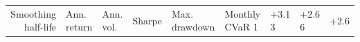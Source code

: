 \begin{tabular}{rlllllll}
\toprule
Smoothing half-life & Ann. return & Ann. vol. & Sharpe & Max. drawdown & Monthly CVaR 1%
 & +3.1%
3 & +2.6%
6 & +2.6%
\bottomrule
\end{tabular}
